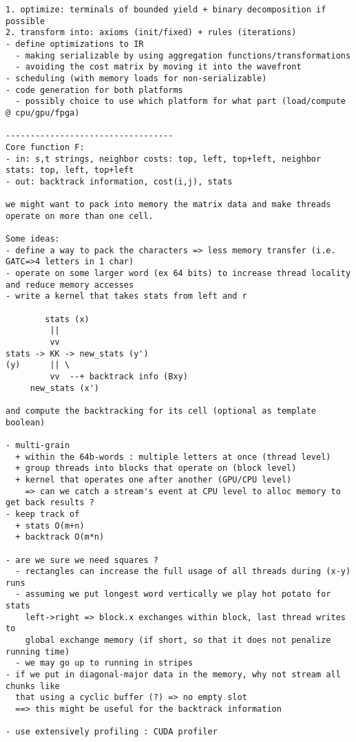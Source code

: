 \documentclass[11pt]{article}
\begin{document}
\begin{verbatim}
1. optimize: terminals of bounded yield + binary decomposition if possible
2. transform into: axioms (init/fixed) + rules (iterations)
- define optimizations to IR
  - making serializable by using aggregation functions/transformations
  - avoiding the cost matrix by moving it into the wavefront
- scheduling (with memory loads for non-serializable)
- code generation for both platforms
  - possibly choice to use which platform for what part (load/compute @ cpu/gpu/fpga)

----------------------------------
Core function F:
- in: s,t strings, neighbor costs: top, left, top+left, neighbor stats: top, left, top+left
- out: backtrack information, cost(i,j), stats

we might want to pack into memory the matrix data and make threads operate on more than one cell.

Some ideas:
- define a way to pack the characters => less memory transfer (i.e. GATC=>4 letters in 1 char)
- operate on some larger word (ex 64 bits) to increase thread locality and reduce memory accesses
- write a kernel that takes stats from left and r

        stats (x)
         ||
         vv
stats -> KK -> new_stats (y')
(y)      || \
         vv  --+ backtrack info (Bxy)
     new_stats (x')

and compute the backtracking for its cell (optional as template boolean)

- multi-grain
  + within the 64b-words : multiple letters at once (thread level)
  + group threads into blocks that operate on (block level)
  + kernel that operates one after another (GPU/CPU level)
    => can we catch a stream's event at CPU level to alloc memory to get back results ?
- keep track of
  + stats O(m+n)
  + backtrack O(m*n)

- are we sure we need squares ?
  - rectangles can increase the full usage of all threads during (x-y) runs
  - assuming we put longest word vertically we play hot potato for stats
    left->right => block.x exchanges within block, last thread writes to
    global exchange memory (if short, so that it does not penalize running time)
  - we may go up to running in stripes
- if we put in diagonal-major data in the memory, why not stream all chunks like
  that using a cyclic buffer (?) => no empty slot
  ==> this might be useful for the backtrack information

- use extensively profiling : CUDA profiler


\end{verbatim}
\end{document}
